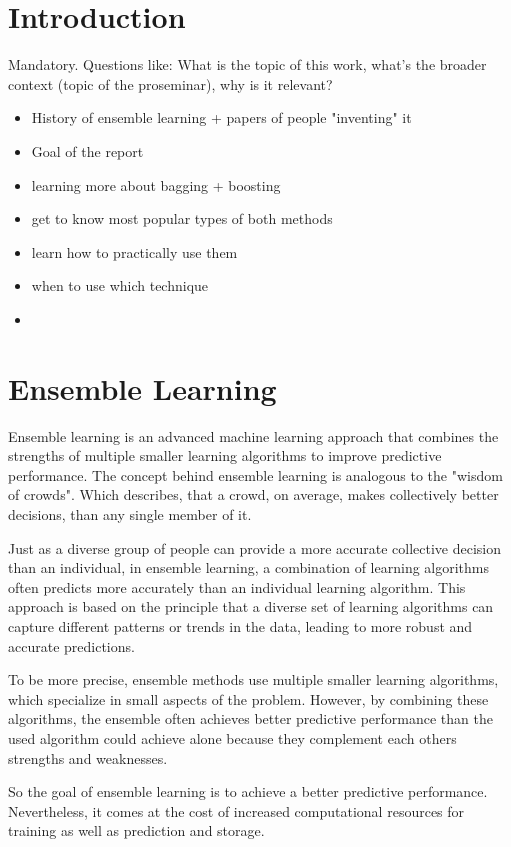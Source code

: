 \section{Introduction}
Mandatory. Questions like: What is the topic of this work, what's the broader context (topic of the proseminar), why is it relevant?

\begin{itemize}
    \item History of ensemble learning + papers of people "inventing" it
    \item Goal of the report
    \item learning more about bagging + boosting
    \item get to know most popular types of both methods
    \item learn how to practically use them
    \item when to use which technique
    \item 
\end{itemize}
\section{Ensemble Learning}

Ensemble learning is an advanced machine learning approach that combines the 
strengths of multiple smaller learning algorithms to improve predictive 
performance. 
The concept behind ensemble learning is analogous to the "wisdom of crowds".
Which describes, that a crowd, on average, makes collectively better decisions,
than any single member of it.

Just as a diverse group of people can provide a more accurate collective decision 
than an individual, in ensemble learning, a combination of learning algorithms
often predicts more accurately than an individual learning algorithm.
This approach is based on the principle that a diverse set of learning algorithms
can capture different patterns or trends in the data, leading to more robust and 
accurate predictions.

To be more precise, ensemble methods use multiple smaller learning algorithms,
which specialize in small aspects of the problem. However, by combining these
algorithms, the ensemble often achieves better predictive performance than 
the used algorithm could achieve alone because they complement each others
strengths and weaknesses.

So the goal of ensemble learning is to achieve a better predictive performance.
Nevertheless, it comes at the cost of increased computational resources for 
training as well as prediction and storage.

